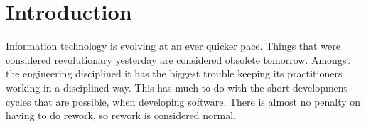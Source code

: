 \documentclass[\docroot/main]{subfiles}
\begin{document}
\chapter*{Introduction}

Information technology is evolving at an ever quicker pace. Things that were
considered revolutionary yesterday are considered obsolete tomorrow.
Amongst the engineering disciplined it has the biggest trouble keeping its
practitioners working in a disciplined way. This has much to do with
the short development cycles that are possible, when developing software.
There is almost no penalty on having to do rework, so rework is considered normal.
\end{document}
